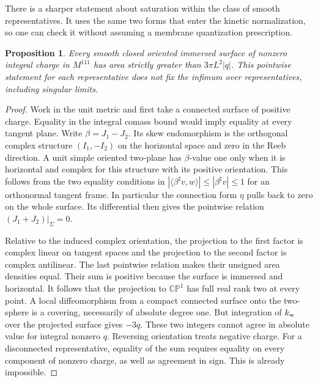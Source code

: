 \documentclass[aps,prd,reprint,onecolumn,nofootinbib,amsmath,amssymb]{revtex4-2}
\newtheorem{proposition}{Proposition}
\begin{document}
There is a sharper statement about saturation within the class of smooth representatives. It uses the same two forms that enter the kinetic normalization, so one can check it without assuming a membrane quantization prescription.

\begin{proposition}
Every smooth closed oriented immersed surface of nonzero integral charge in $M^{111}$ has area strictly greater than $3\pi L^2|q|$. This pointwise statement for each representative does not fix the infimum over representatives, including singular limits.
\end{proposition}

\begin{proof}
Work in the unit metric and first take a connected surface of positive charge. Equality in the integral comass bound would imply equality at every tangent plane. Write $\beta=J_1-J_2$. Its skew endomorphism is the orthogonal complex structure $(I_1,-I_2)$ on the horizontal space and zero in the Reeb direction. A unit simple oriented two-plane has $\beta$-value one only when it is horizontal and complex for this structure with its positive orientation. This follows from the two equality conditions in $|\langle \beta^\sharp v,w\rangle|\leq|\beta^\sharp v|\leq1$ for an orthonormal tangent frame. In particular the connection form $\eta$ pulls back to zero on the whole surface. Its differential then gives the pointwise relation $(J_1+J_2)|_\Sigma=0$.

Relative to the induced complex orientation, the projection to the first factor is complex linear on tangent spaces and the projection to the second factor is complex antilinear. The last pointwise relation makes their unsigned area densities equal. Their sum is positive because the surface is immersed and horizontal. It follows that the projection to $\mathbb{CP}^1$ has full real rank two at every point. A local diffeomorphism from a compact connected surface onto the two-sphere is a covering, necessarily of absolute degree one. But integration of $k_{\rm w}$ over the projected surface gives $-3q$. These two integers cannot agree in absolute value for integral nonzero $q$. Reversing orientation treats negative charge. For a disconnected representative, equality of the sum requires equality on every component of nonzero charge, as well as agreement in sign. This is already impossible.
\end{proof}
\end{document}
